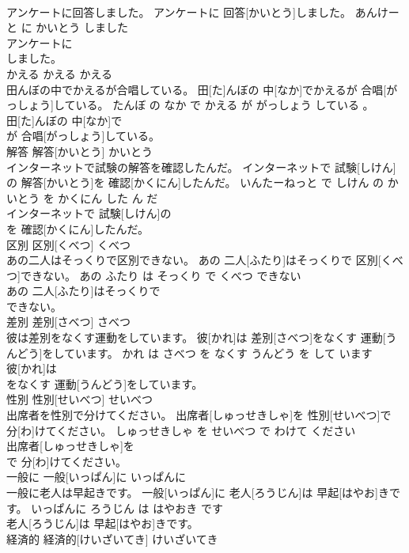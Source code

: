\documentclass[8pt]{extreport}
\begin{document}
\begin{CJK}{UTF8}{min}
\\	アンケートに回答しました。	アンケートに 回答[かいとう]しました。	あんけーと に かいとう しました	
\\	アンケートに
\\	しました。			
\\	かえる	かえる	かえる	
\\	田んぼの中でかえるが合唱している。	田[た]んぼの 中[なか]でかえるが 合唱[がっしょう]している。	たんぼ の なか で かえる が がっしょう している 。	
\\	田[た]んぼの 中[なか]で
\\	が 合唱[がっしょう]している。			
\\	解答	解答[かいとう]	かいとう	
\\	インターネットで試験の解答を確認したんだ。	インターネットで 試験[しけん]の 解答[かいとう]を 確認[かくにん]したんだ。	いんたーねっと で しけん の かいとう を かくにん した ん だ	
\\	インターネットで 試験[しけん]の
\\	を 確認[かくにん]したんだ。			
\\	区別	区別[くべつ]	くべつ	
\\	あの二人はそっくりで区別できない。	あの 二人[ふたり]はそっくりで 区別[くべつ]できない。	あの ふたり は そっくり で くべつ できない	
\\	あの 二人[ふたり]はそっくりで
\\	できない。			
\\	差別	差別[さべつ]	さべつ	
\\	彼は差別をなくす運動をしています。	彼[かれ]は 差別[さべつ]をなくす 運動[うんどう]をしています。	かれ は さべつ を なくす うんどう を して います	
\\	彼[かれ]は
\\	をなくす 運動[うんどう]をしています。			
\\	性別	性別[せいべつ]	せいべつ	
\\	出席者を性別で分けてください。	出席者[しゅっせきしゃ]を 性別[せいべつ]で 分[わ]けてください。	しゅっせきしゃ を せいべつ で わけて ください	
\\	出席者[しゅっせきしゃ]を
\\	で 分[わ]けてください。			
\\	一般に	一般[いっぱん]に	いっぱんに	
\\	一般に老人は早起きです。	一般[いっぱん]に 老人[ろうじん]は 早起[はやお]きです。	いっぱんに ろうじん は はやおき です	
\\	老人[ろうじん]は 早起[はやお]きです。			
\\	経済的	経済的[けいざいてき]	けいざいてき	

\end{CJK}
\end{document}
